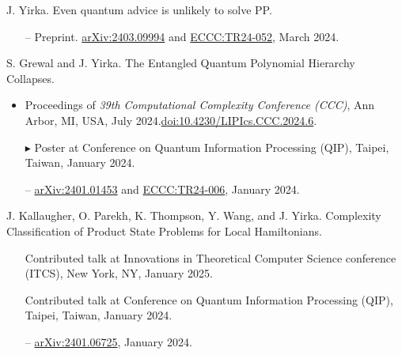 \documentclass[11pt,letterpaper,serif]{moderncv}
\begin{document}
J. Yirka.\quad
Even quantum advice is unlikely to solve \textup{PP}.
\begin{adjustwidth}{.1in}{}
	\begin{itemize}
		\item[--] Preprint. \href{https://arxiv.org/abs/2403.09994}{arXiv:2403.09994} and \href{https://eccc.weizmann.ac.il/report/2024/052/}{ECCC:TR24-052}, March 2024.
	\end{itemize}
\end{adjustwidth}
\medskip

S. Grewal and J. Yirka.\quad
The Entangled Quantum Polynomial Hierarchy Collapses.
\begin{adjustwidth}{.1in}{}
	\begin{itemize}
		\item Proceedings of \textit{39th Computational Complexity Conference (CCC)}, Ann Arbor, MI, USA, July 2024.\quad \href{https://doi.org/10.4230/LIPIcs.CCC.2024.6}{doi:10.4230/LIPIcs.CCC.2024.6}.
		\item[$\blacktriangleright$] Poster at Conference on Quantum Information Processing (QIP), Taipei, Taiwan, January 2024.
		\item[--] \href{https://arxiv.org/abs/2401.01453}{arXiv:2401.01453} and \href{https://eccc.weizmann.ac.il/report/2024/006/}{ECCC:TR24-006}, January 2024.
	\end{itemize}
\end{adjustwidth}
\medskip

J. Kallaugher, O. Parekh, K. Thompson, Y. Wang, and J. Yirka.\quad
Complexity Classification of Product State Problems for Local Hamiltonians.
\begin{adjustwidth}{.1in}{}
	\begin{itemize}
		\item[\textbullet] Contributed talk at Innovations in Theoretical Computer Science conference (ITCS), New York, NY, January 2025.
		\item[\textbullet] Contributed talk at Conference on Quantum Information Processing (QIP), Taipei, Taiwan, January 2024.
		\item[--] \href{https://arxiv.org/abs/2401.06725}{arXiv:2401.06725}, January 2024.
	\end{itemize}
\end{adjustwidth}
\medskip
\end{document}
